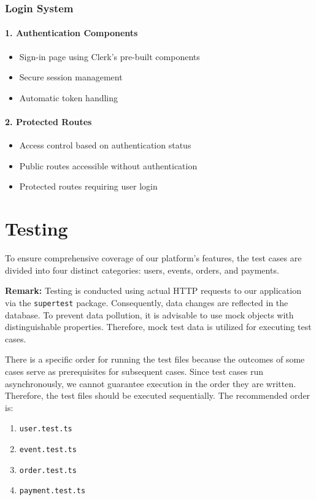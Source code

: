 \subsubsection{Login System}
\paragraph{1. Authentication Components}
\begin{itemize}
    \item Sign-in page using Clerk's pre-built components
    \item Secure session management
    \item Automatic token handling
\end{itemize}

\paragraph{2. Protected Routes}
\begin{itemize}
    \item Access control based on authentication status
    \item Public routes accessible without authentication
    \item Protected routes requiring user login
\end{itemize}




\section{Testing}

To ensure comprehensive coverage of our platform's features, the test cases are divided into four distinct categories: users, events, orders, and payments.

\textbf{Remark:} Testing is conducted using actual HTTP requests to our application via the \texttt{supertest}\cite{supertest} package. Consequently, data changes are reflected in the database. To prevent data pollution, it is advisable to use mock objects with distinguishable properties. Therefore, mock test data is utilized for executing test cases.

There is a specific order for running the test files because the outcomes of some cases serve as prerequisites for subsequent cases. Since test cases run asynchronously, we cannot guarantee execution in the order they are written. Therefore, the test files should be executed sequentially. The recommended order is:
\begin{enumerate}
    \item \texttt{user.test.ts}
    \item \texttt{event.test.ts}
    \item \texttt{order.test.ts}
    \item \texttt{payment.test.ts}
\end{enumerate}

